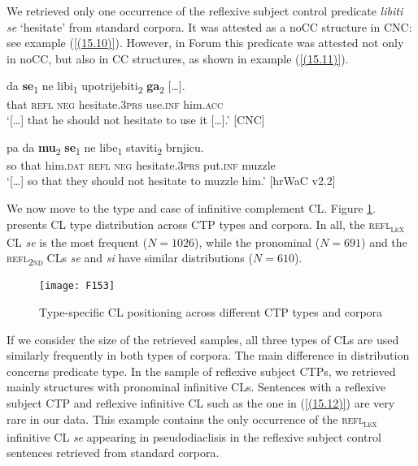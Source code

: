 \noindent We retrieved only one occurrence of the reflexive subject control predicate \textit{libiti se} ‘hesitate’ from standard corpora. It was attested as a noCC structure in CNC: see example (\ref{(15.10)}). However, in Forum this predicate was attested not only in noCC, but also in CC structures, as shown in example (\ref{(15.11)}).

\begin{exe}\ex\label{(15.10)}
\gll [\dots] da \textbf{se}\textsubscript{1} ne libi\textsubscript{1} upotrijebiti\textsubscript{2} {\textbf{ga}\textsubscript{2}  [\dots].} \\
  {} that \textsc{refl} \textsc{neg} hesitate.3\textsc{prs} use.\textsc{inf} him.\textsc{acc}  \\
\glt ‘[\dots] that he should not hesitate to use it [\dots].’
\hfill [CNC]

\ex\label{(15.11)}
\gll [\dots] pa da \textbf{mu}\textsubscript{2} \textbf{se}\textsubscript{1} ne libe\textsubscript{1} staviti\textsubscript{2} brnjicu. \\
{} so that him.\textsc{dat} \textsc{refl} \textsc{neg} hesitate.3\textsc{prs} put.\textsc{inf} muzzle \\
\glt ‘[\dots] so that they should not hesitate to muzzle him.’
\hfill [hrWaC v2.2]
\end{exe}

\noindent We now move to the type and case of infinitive complement CL. Figure \ref{F15.3}. presents CL type distribution across CTP types and corpora. In all, the \textsc{refl\textsubscript{lex}} CL \textit{se} is the most frequent ($N=1026$), while the pronominal ($N=691$) and the \textsc{refl\textsubscript{2nd}} CLs \textit{se} and \textit{si} have similar distributions ($N=610$).

\begin{figure}
\caption{Type-specific CL positioning across different CTP types and corpora}
\label{F15.3}
\texttt{[image: F153]}
\end{figure}

If we consider the size of the retrieved samples, all three types of CLs are used similarly frequently in both types of corpora. The main difference in distribution concerns predicate type. In the sample of reflexive subject CTPs, we retrieved mainly structures with pronominal infinitive CLs. Sentences with a reflexive subject CTP and reflexive infinitive CL such as the one in (\ref{(15.12)}) are very rare in our data. This example contains the only occurrence of the \textsc{refl\textsubscript{lex}} infinitive CL \textit{se} appearing in pseudodiaclisis in the reflexive subject control sentences retrieved from standard corpora. 

